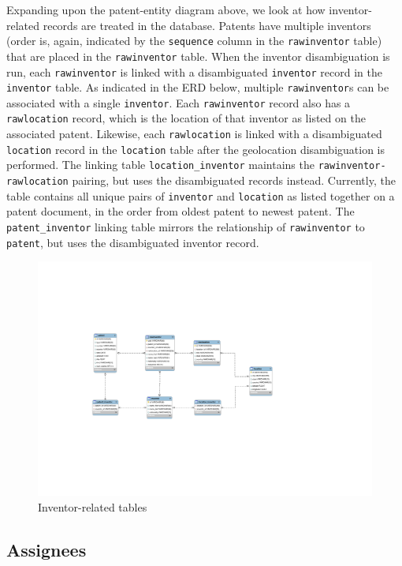 Expanding upon the patent-entity diagram above, we look at how inventor-related records are treated in the database. Patents have multiple inventors (order is, again, indicated by the \verb`sequence` column in the \verb`rawinventor` table) that are placed in the \verb`rawinventor` table. When the inventor disambiguation is run, each \verb`rawinventor` is linked with a disambiguated \verb`inventor` record in the \verb`inventor` table. As indicated in the ERD below, multiple \verb`rawinventor`s can be associated with a single \verb`inventor`. Each \verb`rawinventor` record also has a \verb`rawlocation` record, which is the location of that inventor as listed on the associated patent. Likewise, each \verb`rawlocation` is linked with a disambiguated \verb`location` record in the \verb`location` table after the geolocation disambiguation is performed. The linking table \verb`location_inventor` maintains the \verb`rawinventor-rawlocation` pairing, but uses the disambiguated records instead. Currently, the table contains all unique pairs of \verb`inventor` and \verb`location` as listed together on a patent document, in the order from oldest patent to newest patent. The \verb`patent_inventor` linking table mirrors the relationship of \verb`rawinventor` to \verb`patent`, but uses the disambiguated inventor record.

\begin{figure}[!htbp]
\includegraphics[width=\linewidth]{figs/Inventor}
\caption{Inventor-related tables}
\end{figure}

\subsection*{Assignees}


